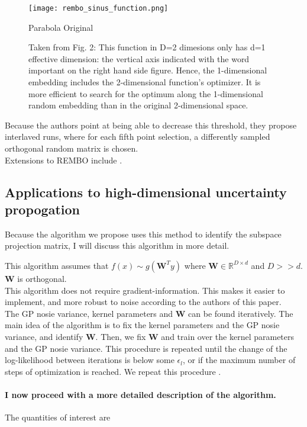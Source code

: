 \begin{figure}[H]
    \centering
        \texttt{[image: rembo\_sinus\_function.png]}
        \caption{Parabola Original}
        \label{fig:gull}
    \caption{
    Taken from \citep{Wang2013} Fig. 2: This function in D=2 dimesions only has d=1 effective dimension: the vertical axis indicated with the word important on the right hand side figure. 
    Hence, the 1-dimensional embedding includes the 2-dimensional function’s optimizer. 
    It is more efficient to search for the optimum along the 1-dimensional random embedding than in the original 2-dimensional space.
    }\label{fig:animals}
\end{figure}

Because the authors point at being able to decrease this threshold, they propose interlaved runs, where for each fifth point selection, a differently sampled orthogonal random matrix is chosen. \\

Extensions to REMBO include \citep{RemboExtension}.

\subsection{Applications to high-dimensional uncertainty propogation}
Because the algorithm we propose uses this method to identify the subspace projection matrix, I will discuss this algorithm in more detail.

\citep{Tripathy} This algorithm assumes that  $f(x) \sim g( \mathbf{W}^T y)$ where $ \mathbf{W} \in \mathbb{R}^{D \times d} $ and $D >> d$.
$ \mathbf{W} $ is orthogonal. \\

This algorithm does not require gradient-information.
This makes it easier to implement, and more robust to noise according to the authors of this paper. \\
The GP nosie variance, kernel parameters and  $ \mathbf{W} $ can be found iteratively.
The main idea of the algorithm is to fix the kernel parameters and the GP nosie variance, and identify $ \mathbf{W} $.
Then, we fix $ \mathbf{W} $ and train over the kernel parameters and the GP nosie variance.
This procedure is repeated until the change of the log-likelihood between iterations is below some $ \epsilon_l $, or if the maximum number of steps of optimization is reached.
We repeat this procedure .\\

\paragraph{I now proceed with a more detailed description of the algorithm.}
The quantities of interest are

